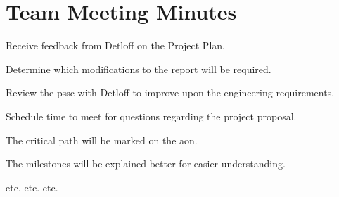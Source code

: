 \chapter{Team Meeting Minutes}
\minutesdetails
{
	\item Receive feedback from Detloff on the Project Plan.
	\item Determine which modifications to the report will be required.
	\item Review the \gls{pssc} with Detloff to improve upon the engineering requirements.
	\item Schedule time to meet for questions regarding the project proposal.}
{
	\item The critical path will be marked on the \gls{aon}.
	\item The milestones will be explained better for easier understanding. 
	\item etc. etc. etc.
}

\signatures